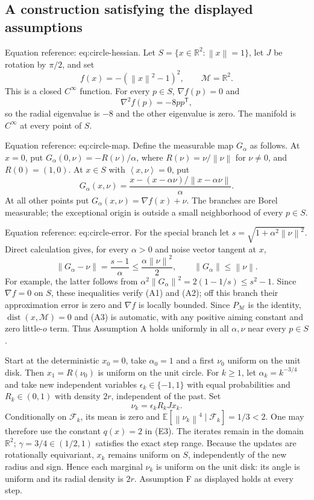 \documentclass[10pt]{article}
\begin{document}
\subsection*{A construction satisfying the displayed assumptions}
Equation reference: eq:circle-hessian. Let \(S=\{x\in\mathbb R^2:\left\|x\right\|=1\}\), let \(J\) be rotation by \(\pi/2\), and set \[f(x)=-(\left\|x\right\|^2-1)^2,\qquad \mathcal M=\mathbb R^2.\] This is a closed \(C^\infty\) function. For every \(p\in S\), \(\nabla f(p)=0\) and \[
 \nabla^2 f(p)=-8pp^{\mathsf T},\] so the radial eigenvalue is \(-8\) and the other eigenvalue is zero. The manifold is \(C^\infty\) at every point of \(S\).\par
Equation reference: eq:circle-map. Define the measurable map \(G_\alpha\) as follows. At \(x=0\), put \(G_\alpha(0,\nu)=-R(\nu)/\alpha\), where \(R(\nu)=\nu/\left\|\nu\right\|\) for \(\nu\ne0\), and \(R(0)=(1,0)\). At \(x\in S\) with \(\left\langle x,\nu\right\rangle=0\), put \[
 G_\alpha(x,\nu)=
 \frac{x-(x-\alpha\nu)/\left\|x-\alpha\nu\right\|}{\alpha}.\] At all other points put \(G_\alpha(x,\nu)=\nabla f(x)+\nu\). The branches are Borel measurable; the exceptional origin is outside a small neighborhood of every \(p\in S\).\par
Equation reference: eq:circle-error. For the special branch let \(s=\sqrt{1+\alpha^2\left\|\nu\right\|^2}\). Direct calculation gives, for every \(\alpha>0\) and noise vector tangent at \(x\), \[
 \left\|G_\alpha-\nu\right\|=\frac{s-1}{\alpha}
 \le \frac{\alpha\left\|\nu\right\|^2}{2},\qquad
 \left\|G_\alpha\right\|\le\left\|\nu \right\|.\] For example, the latter follows from \(\alpha^2\left\|G_\alpha\right\|^2=2(1-1/s)\le s^2-1\). Since \(\nabla f=0\) on \(S\), these inequalities verify (A1) and (A2); off this branch their approximation error is zero and \(\nabla f\) is locally bounded. Since \(P_\mathcal M\) is the identity, \(\mathop{\mathrm{dist}}(x,\mathcal M)=0\) and (A3) is automatic, with any positive aiming constant and zero little-\(o\) term. Thus Assumption A holds uniformly in all \(\alpha,\nu\) near every \(p\in S\).\par
Start at the deterministic \(x_0=0\), take \(\alpha_0=1\) and a first \(\nu_0\) uniform on the unit disk. Then \(x_1=R(\nu_0)\) is uniform on the unit circle. For \(k\ge1\), let \(\alpha_k=k^{-3/4}\) and take new independent variables \(\epsilon_k\in\{-1,1\}\) with equal probabilities and \(R_k\in(0,1)\) with density \(2r\), independent of the past. Set \[\nu_k=\epsilon_kR_kJx_k .\] Conditionally on \(\mathcal F_k\), its mean is zero and \(\mathbb E[\left\|\nu_k\right\|^4\mid\mathcal F_k]=1/3<2\). One may therefore use the constant \(q(x)=2\) in (E3). The iterates remain in the domain \(\mathbb R^2\); \(\gamma=3/4\in(1/2,1)\) satisfies the exact step range. Because the updates are rotationally equivariant, \(x_k\) remains uniform on \(S\), independently of the new radius and sign. Hence each marginal \(\nu_k\) is uniform on the unit disk: its angle is uniform and its radial density is \(2r\). Assumption F as displayed holds at every step.\par
\end{document}
